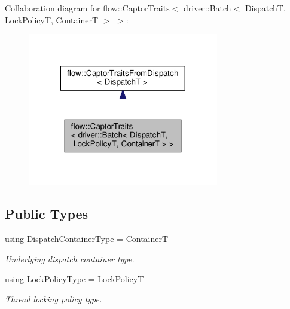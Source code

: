 Collaboration diagram for flow\+:\+:Captor\+Traits$<$ driver\+:\+:Batch$<$ DispatchT, Lock\+PolicyT, ContainerT $>$ $>$\+:\nopagebreak
\begin{figure}[H]
\begin{center}
\leavevmode
\includegraphics[width=236pt]{structflow_1_1_captor_traits_3_01driver_1_1_batch_3_01_dispatch_t_00_01_lock_policy_t_00_01_container_t_01_4_01_4__coll__graph}
\end{center}
\end{figure}
\subsection*{Public Types}
\begin{DoxyCompactItemize}
\item 
\mbox{\label{structflow_1_1_captor_traits_3_01driver_1_1_batch_3_01_dispatch_t_00_01_lock_policy_t_00_01_container_t_01_4_01_4_a64c8347894a5fe9cf684958b3f9ae508}} 
using \hyperlink{structflow_1_1_captor_traits_3_01driver_1_1_batch_3_01_dispatch_t_00_01_lock_policy_t_00_01_container_t_01_4_01_4_a64c8347894a5fe9cf684958b3f9ae508}{Dispatch\+Container\+Type} = ContainerT
\begin{DoxyCompactList}\small\item\em Underlying dispatch container type. \end{DoxyCompactList}\item 
\mbox{\label{structflow_1_1_captor_traits_3_01driver_1_1_batch_3_01_dispatch_t_00_01_lock_policy_t_00_01_container_t_01_4_01_4_acee413b37ecf2d580e007973a6bed6a5}} 
using \hyperlink{structflow_1_1_captor_traits_3_01driver_1_1_batch_3_01_dispatch_t_00_01_lock_policy_t_00_01_container_t_01_4_01_4_acee413b37ecf2d580e007973a6bed6a5}{Lock\+Policy\+Type} = Lock\+PolicyT
\begin{DoxyCompactList}\small\item\em Thread locking policy type. \end{DoxyCompactList}\end{DoxyCompactItemize}


